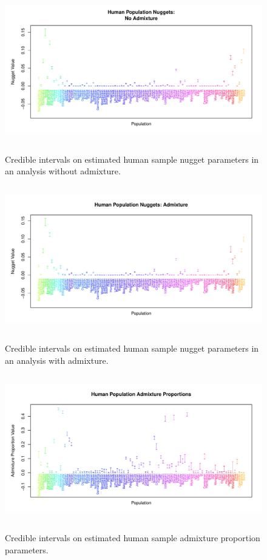 \documentclass[12pt]{article}
\begin{document}
\begin{figure}
\centering
	{\includegraphics[width=5in,height=2.5in]{figs/globetrotter/globe_NoAd_nugget.pdf}}
	\caption{Credible intervals on estimated human sample nugget parameters in an analysis without admixture.}\label{sfig:globe_noad_nugg}
\end{figure}

\begin{figure}
\centering
	{\includegraphics[width=5in,height=2.5in]{figs/globetrotter/globe_Ad_nugget.pdf}}
	\caption{Credible intervals on estimated human sample nugget parameters in an analysis with admixture.}\label{sfig:globe_ad_nugg}
\end{figure}

\clearpage

\begin{figure}
\centering
	{\includegraphics[width=5in,height=2.5in]{figs/globetrotter/globe_adprop.pdf}}
	\caption{Credible intervals on estimated human sample admixture proportion parameters.}\label{sfig:globe_adprops}
\end{figure}
\end{document}
